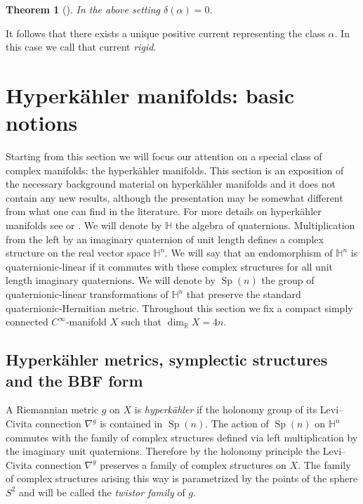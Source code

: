 \documentclass[11pt]{article}
\newcommand{\6}{\partial}
\newcommand{\bbR}{\mathbb{R}}
\newcommand{\bbH}{\mathbb{H}}
\newcommand{\Sp}{\operatorname{Sp}}
\newtheorem{thm}[defn]{Theorem}
\begin{document}
\begin{thm}[\cite{_Cantat:K3_, DS3}] \label{_dyn_current_rigid_Theorem_}
In the above setting $\delta({\alpha}) = 0$.
\end{thm}

It follows that there exists a unique positive current representing the class $\alpha$.
In this case we call that current {\em rigid}.


\section{Hyperk\"ahler manifolds: basic notions}\label{sec_hk}

Starting from this section we will focus our attention on a special class of complex manifolds:
the hyperk\"ahler manifolds. This section is an exposition of the necessary background material
on hyperk\"ahler manifolds and it does not contain any new results, although the presentation
may be somewhat different from what one can find in the literature. For more details
on hyperk\"ahler manifolds see \cite{Hu} or \cite{So}. We will denote by $\bbH$ the algebra
of quaternions. Multiplication from the left by an imaginary quaternion of unit length
defines a complex structure on the real vector space $\bbH^n$. We will say that an
endomorphism of $\bbH^n$ is quaternionic-linear if it commutes with these complex structures
for all unit length imaginary quaternions. We will denote by $\Sp(n)$ the group
of quaternionic-linear transformations of $\bbH^n$
that preserve the standard quaternionic-Hermitian metric. Throughout this
section we fix a compact simply connected $C^\infty$-manifold $X$ such that $\dim_\bbR X = 4n$.

\subsection{Hyperk\"ahler metrics, symplectic structures and the BBF form}\label{sec_HK_intro}
A Riemannian metric $g$ on $X$ is {\em hyperk\"ahler} if the holonomy group of its Levi--Civita
connection $\nabla^g$ is contained in $\Sp(n)$. The action of $\Sp(n)$ on $\bbH^n$ commutes with
the family of complex structures defined via left multiplication by the imaginary unit quaternions.
Therefore by the holonomy principle the Levi--Civita connection $\nabla^g$ preserves a family
of complex structures on $X$.
The family of complex structures arising this way is parametrized by the points of the sphere $S^2$
and will be called the {\em twistor family} of $g$.
\end{document}
